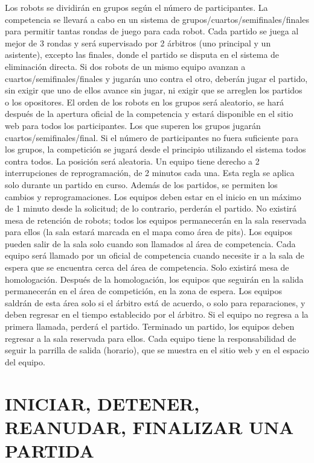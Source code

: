 \documentclass[
  letterpaper,
  DIV=11,
  numbers=noendperiod]{scrreprt}
\begin{document}
Los robots se dividirán en grupos según el número de participantes. La
competencia se llevará a cabo en un sistema de
grupos/cuartos/semifinales/finales para permitir tantas rondas de juego
para cada robot. Cada partido se juega al mejor de 3 rondas y será
supervisado por 2 árbitros (uno principal y un asistente), excepto las
finales, donde el partido se disputa en el sistema de eliminación
directa. Si dos robots de un mismo equipo avanzan a
cuartos/semifinales/finales y jugarán uno contra el otro, deberán jugar
el partido, sin exigir que uno de ellos avance sin jugar, ni exigir que
se arreglen los partidos o los opositores. El orden de los robots en los
grupos será aleatorio, se hará después de la apertura oficial de la
competencia y estará disponible en el sitio web para todos los
participantes. Los que superen los grupos jugarán
cuartos/semifinales/final. Si el número de participantes no fuera
suficiente para los grupos, la competición se jugará desde el principio
utilizando el sistema todos contra todos. La posición será aleatoria. Un
equipo tiene derecho a 2 interrupciones de reprogramación, de 2 minutos
cada una. Esta regla se aplica solo durante un partido en curso. Además
de los partidos, se permiten los cambios y reprogramaciones. Los equipos
deben estar en el inicio en un máximo de 1 minuto desde la solicitud; de
lo contrario, perderán el partido. No existirá mesa de retención de
robots; todos los equipos permanecerán en la sala reservada para ellos
(la sala estará marcada en el mapa como área de pits). Los equipos
pueden salir de la sala solo cuando son llamados al área de competencia.
Cada equipo será llamado por un oficial de competencia cuando necesite
ir a la sala de espera que se encuentra cerca del área de competencia.
Solo existirá mesa de homologación. Después de la homologación, los
equipos que seguirán en la salida permanecerán en el área de
competición, en la zona de espera. Los equipos saldrán de esta área solo
si el árbitro está de acuerdo, o solo para reparaciones, y deben
regresar en el tiempo establecido por el árbitro. Si el equipo no
regresa a la primera llamada, perderá el partido. Terminado un partido,
los equipos deben regresar a la sala reservada para ellos. Cada equipo
tiene la responsabilidad de seguir la parrilla de salida (horario), que
se muestra en el sitio web y en el espacio del equipo.

\section{INICIAR, DETENER, REANUDAR, FINALIZAR UNA
PARTIDA}\label{iniciar-detener-reanudar-finalizar-una-partida}
\end{document}
